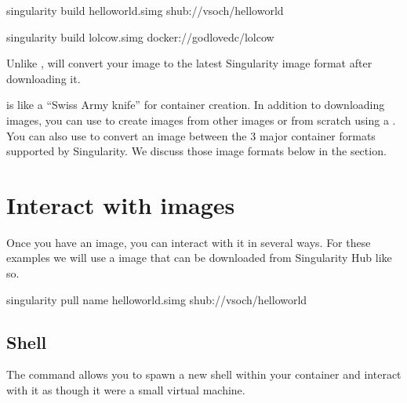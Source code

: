 \documentclass[letterpaper,10pt,english]{sphinxmanual}
\begin{document}
%
\begin{sphinxVerbatim}[commandchars=\\\{\}]
\PYGZdl{} singularity build hello\PYGZhy{}world.simg shub://vsoch/hello\PYGZhy{}world

\PYGZdl{} singularity build lolcow.simg docker://godlovedc/lolcow
\end{sphinxVerbatim}

Unlike ,  will convert your image to the latest Singularity image format
after downloading it.

 is like a “Swiss Army knife” for container creation. In addition to
downloading images, you can use  to create images from other images or
from scratch using a . You can also use  to convert an image between the
3 major container formats supported by Singularity. We discuss those
image formats below in the {\hyperref[\detokenize{quick_start:build-images-from-scratch}]{}} section.


\section{Interact with images}
\label{\detokenize{quick_start:interact-with-images}}
Once you have an image, you can interact with it in several ways. For
these examples we will use a  image that can be downloaded from
Singularity Hub like so.

%
\begin{sphinxVerbatim}[commandchars=\\\{\}]
\PYGZdl{} singularity pull \PYGZhy{}\PYGZhy{}name hello\PYGZhy{}world.simg shub://vsoch/hello\PYGZhy{}world
\end{sphinxVerbatim}


\subsection{Shell}
\label{\detokenize{quick_start:shell}}
The {\hyperref[\detokenize{appendix:shell-command}]{}} command allows you to spawn a new shell within your container and
interact with it as though it were a small virtual machine.
\end{document}

